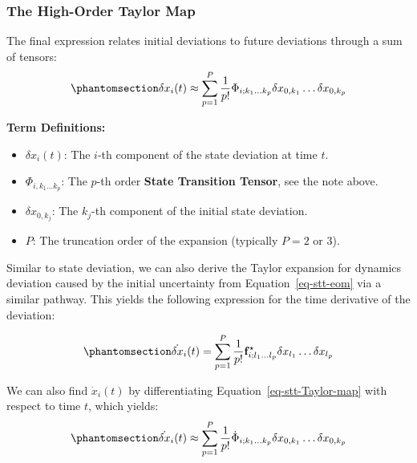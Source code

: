 \documentclass[
  letterpaper,
  DIV=11,
  numbers=noendperiod,
  oneside]{scrartcl}
\begin{document}
\subsubsection{The High-Order Taylor
Map}\label{the-high-order-taylor-map}

The final expression relates initial deviations to future deviations
through a sum of tensors:
\begin{equation}\protect\phantomsection\label{eq-stt-Taylor-map}{
\delta x_i(t) \approx \sum_{p=1}^P \frac{1}{p!} \Phi_{i;k_1 \dots k_p} \delta x_{0,k_1} \dots \delta x_{0,k_p}
}\end{equation}

\textbf{Term Definitions:}

\begin{itemize}
\item
  \(\delta x_i(t)\): The \(i\)-th component of the state deviation at
  time \(t\).
\item
  \(\Phi_{i,k_1 \dots k_p}\): The \(p\)-th order \textbf{State
  Transition Tensor}, see the note above.
\item
  \(\delta x_{0,k_j}\): The \(k_j\)-th component of the initial state
  deviation.
\item
  \(P\): The truncation order of the expansion (typically \(P=2\) or
  \(3\)).
\end{itemize}

Similar to state deviation, we can also derive the Taylor expansion for
dynamics deviation caused by the initial uncertainty from
Equation~\ref{eq-stt-eom} via a similar pathway. This yields the
following expression for the time derivative of the deviation:

\begin{equation}\protect\phantomsection\label{eq-stt-eom-Taylor-map}{
\dot{\delta x}_i(t) = \sum_{p=1}^P \frac{1}{p!} \mathbf{f}^{\star}_{i; l_1 \dots l_p} \delta x_{l_1} \dots \delta x_{l_p}
}\end{equation}

\marginnote{\begin{footnotesize}

\[
\mathbf{f}^{\star}_{i; l_1 \dots l_p} = \left. \frac{\partial^p f_i}{\partial x_{l_1} \dots \partial x_{l_p}} \right|_{\mathbf{x}^*(t)}
\]

\end{footnotesize}}

We can also find \(\dot{x}_i(t)\) by differentiating
Equation~\ref{eq-stt-Taylor-map} with respect to time \(t\), which
yields:
\begin{equation}\protect\phantomsection\label{eq-stt-Taylor-map-time-derivative}{
\dot{\delta x}_i(t) \approx \sum_{p=1}^P \frac{1}{p!} \dot{\Phi}_{i; k_1 \dots k_p} \delta x_{0,k_1} \dots \delta x_{0,k_p}
}\end{equation}
\end{document}
